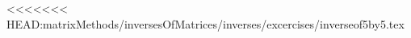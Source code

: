 \documentclass{ximera}
\begin{document}
<<<<<<< HEAD:matrixMethods/inversesOfMatrices/inverses/excercises/inverseof5by5.tex
\end{document}
